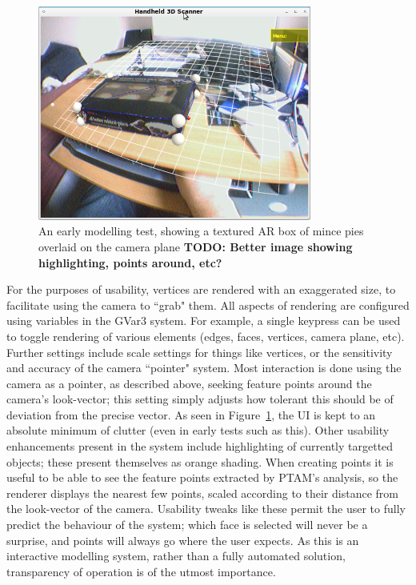\documentclass[a4paper,10pt]{article}
\begin{document}
\begin{figure}
  \begin{center}
    \includegraphics[width=340px]{MincePies}
  \end{center}
  \caption{An early modelling test, showing a textured AR box of mince pies overlaid on the camera plane \textbf{TODO: Better image showing highlighting, points around, etc?}}
  \label{pies}
\end{figure}

For the purposes of usability, vertices are rendered with an exaggerated size, to facilitate using the camera to ``grab" them. All aspects of rendering are configured using variables in the GVar3 system. For example, a single keypress can be used to toggle rendering of various elements (edges, faces, vertices, camera plane, etc). Further settings include scale settings for things like vertices, or the sensitivity and accuracy of the camera ``pointer" system. Most interaction is done using the camera as a pointer, as described above, seeking feature points around the camera's look-vector; this setting simply adjusts how tolerant this should be of deviation from the precise vector. As seen in Figure~\ref{pies}, the UI is kept to an absolute minimum of clutter (even in early tests such as this). Other usability enhancements present in the system include highlighting of currently targetted objects; these present themselves as orange shading. When creating points it is useful to be able to see the feature points extracted by PTAM's analysis, so the renderer displays the nearest few points, scaled according to their distance from the look-vector of the camera. Usability tweaks like these permit the user to fully predict the behaviour of the system; which face is selected will never be a surprise, and points will always go where the user expects.	As this is an interactive modelling system, rather than a fully automated solution, transparency of operation is of the utmost importance.
\end{document}
